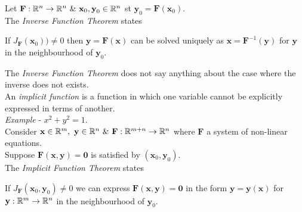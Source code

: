 \documentclass[11pt,a4paper]{article}
\begin{document}
Let $\textbf{F} : \real^n \to \real^n\ \&\ \textbf{x}_0,\textbf{y}_0 \in \real^n$ st $\textbf{y}_0=\textbf{F}(\textbf{x}_0)$.\\
The \textit{Inverse Function Theorem} states
\begin{center}If $J_\textbf{F}(\textbf{x}_0))\neq0$ then $\textbf{y}=\textbf{F}(\textbf{x})$ can be solved uniquely as $\textbf{x}=\textbf{F}^{-1}(\textbf{y})$ for $\textbf{y}$ in the neighbourhood of $\textbf{y}_0$.\end{center}

The \textit{Inverse Function Theorem} does not say anything about the case where the inverse does not exists.\\

An \textit{implicit function} is a function in which one variable cannot be explicitly expressed in terms of another.\\
\textit{Example} - $x^2+y^2=1$.\\

Consider $\textbf{x} \in\real^m,\ \textbf{y}\in\real^n\ \&\ \textbf{F} : \real^{m+n} \to \real^n$ where $\textbf{F}$ a system of non-linear equations.\\
Suppose $\textbf{F}(\textbf{x},\textbf{y})=\textbf{0}$ is satisfied by $(\textbf{x}_0, \textbf{y}_0)$.\\
The \textit{Implicit Function Theorem} states
\begin{center}If $J_{\textbf{F}}(\textbf{x}_0,\textbf{y}_0)\neq0$ we  can express $\textbf{F}(\textbf{x},\textbf{y})=\textbf{0}$ in the form $\textbf{y}=\textbf{y}(\textbf{x})$ for $\textbf{y} : \mathbb{R}^m \to \mathbb{R}^n$ in the neighbourhood of $\textbf{y}_0$.
\end{center}
\end{document}

